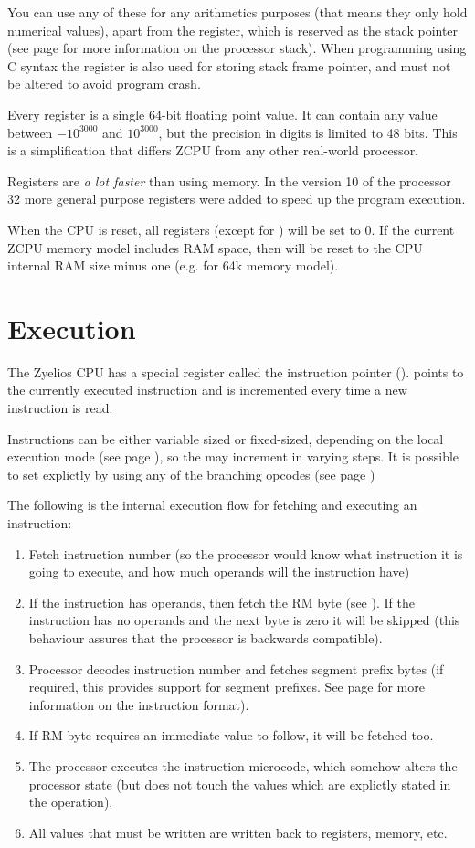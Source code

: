 You can use any of these for any arithmetics purposes (that means they only hold numerical values), apart from the  register, which is reserved as the stack pointer (see page \pageref{stack} for more information on the processor stack). When programming using C syntax the  register is also used for storing stack frame pointer, and must not be altered to avoid program crash.

Every register is a single 64-bit floating point value. It can contain any value between $-10^{3000}$ and $10^{3000}$, but the precision in digits is limited to 48 bits. This is a simplification that differs ZCPU from any other real-world processor.

Registers are \emph{a lot faster} than using memory. In the version 10 of the processor 32 more general purpose registers were added to speed up the program execution.

When the CPU is reset, all registers (except for ) will be set to 0. If the current ZCPU memory model includes RAM space, then  will be reset to the CPU internal RAM size minus one (e.g.  for 64k memory model).

\section{Execution}
The Zyelios CPU has a special register called the instruction pointer ().  points to the currently executed instruction and is incremented every time a new instruction is read.

Instructions can be either variable sized or fixed-sized, depending on the local execution mode (see page \pageref{localexec}), so the  may increment in varying steps. It is possible to set  explictly by using any of the branching opcodes (see page \pageref{branching})

The following is the internal execution flow for fetching and executing an instruction:
\begin{enumerate}
	\item Fetch instruction number (so the processor would know what instruction it is going to execute, and how much operands will the instruction have)
	\item If the instruction has operands, then fetch the RM byte (see ). If the instruction has no operands and the next byte is zero it will be skipped (this behaviour assures that the processor is backwards compatible).
	\item Processor decodes instruction number and fetches segment prefix bytes (if required, this provides support for segment prefixes. See page \pageref{instructionformat} for more information on the instruction format).
	\item If RM byte requires an immediate value to follow, it will be fetched too.
	\item The processor executes the instruction microcode, which somehow alters the processor state (but does not touch the values which are explictly stated in the operation).
	\item All values that must be written are written back to registers, memory, etc.
\end{enumerate}

